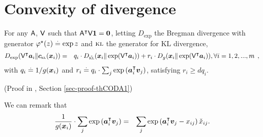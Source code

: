 


\newpage

\section{Convexity of divergence}

\begin{theorem}\label{thCODA1}
For any $\mathsf{A}$, $\mathsf{V}$ such that $\mathsf{A}^\intercal \mathsf{V} \bm{1} = \bm{0}$, letting $D_{\exp}$ the Bregman divergence with generator
$\varphi^\star(z) \stackrel{\mathrm{.}}{=} \exp z$ and ${\textsc{kl}}$ the generator for KL
divergence,
\begin{eqnarray}
 D_{\exp}(\V^\top
\ve{a}_i\|\clrlog({\ve{x}_i}))  & = &  q_i \cdot D_{\check{\kl}} (\ve{x}_i \|
\exp(\V^\top \ve{a}_i)) + r_i \cdot D_{g}(\ve{x}_i
\| \exp(\V^\top \ve{a}_i)), \forall i = 1, 2, ..., m\:\:,
\end{eqnarray}
with $q_i \stackrel{\mathrm{.}}{=} 1/g(\bm{x}_i)$ and $r_i \stackrel{\mathrm{.}}{=} q_i \cdot \sum_j
\exp\left(\bm{a}^\intercal_i
      \bm{v}_j\right)$, satisfying $r_i \geq d q_i$.
\end{theorem}
(Proof in \SM, Section \ref{sec-proof-thCODA1})

We can remark that
\begin{eqnarray}
\frac{1}{g(\bm{x}_i)} \cdot \sum_j
\exp\left(\bm{a}^\intercal_i
      \bm{v}_j\right) & = & \sum_j
\exp\left(\bm{a}^\intercal_i
      \bm{v}_j - x_{ij}\right) \check{x}_{ij}.
\end{eqnarray}

